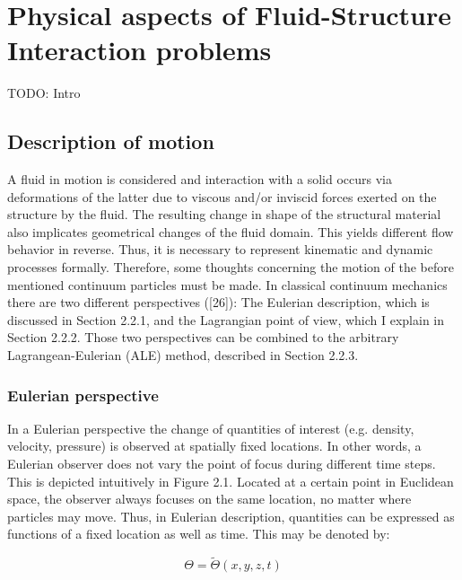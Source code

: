 \chapter{Physical aspects of Fluid-Structure Interaction problems}
\label{cha:physics}


TODO: Intro

\section{Description of motion}
\label{sec:desc-motion}
A fluid in motion is considered and interaction with a solid occurs via deformations of the latter due to
viscous and/or inviscid forces exerted on the structure by the fluid. The resulting change in shape of
the structural material also implicates geometrical changes of the fluid domain. This yields different flow
behavior in reverse. Thus, it is necessary to represent kinematic and dynamic processes formally. Therefore,
some thoughts concerning the motion of the before mentioned continuum particles must be made.
In classical continuum mechanics there are two different perspectives ([26]): The Eulerian description,
which is discussed in Section 2.2.1, and the Lagrangian point of view, which I explain in Section 2.2.2.
Those two perspectives can be combined to the arbitrary Lagrangean-Eulerian (ALE) method, described
in Section 2.2.3.

\subsection{Eulerian perspective}
\label{subsec:euler}

In a Eulerian perspective the change of quantities of interest (e.g. density, velocity, pressure) is observed
at spatially fixed locations. In other words, a Eulerian observer does not vary the point of focus during
different time steps. This is depicted intuitively in Figure 2.1. Located at a certain point in Euclidean
space, the observer always focuses on the same location, no matter where particles may move. Thus, in
Eulerian description, quantities can be expressed as functions of a fixed location as well as time. This
may be denoted by:

\begin{equation}
	\Theta = \tilde{\Theta}(x,y,z,t)
\end{equation}

